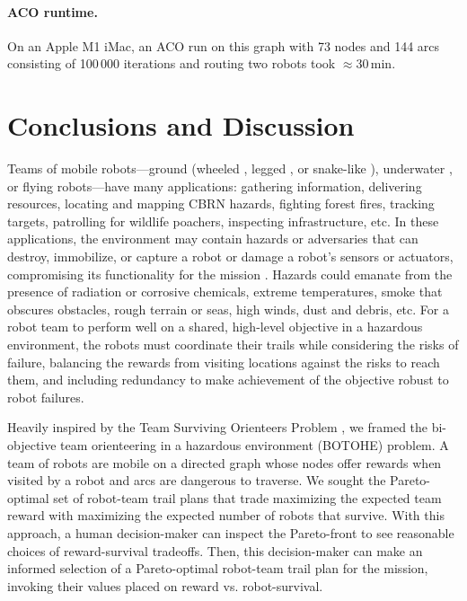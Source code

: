 \documentclass[fleqn,10pt,lineno]{wlpeerj}
\begin{document}
\paragraph{ACO runtime.} On an Apple M1 iMac, an ACO run on this graph with 73 nodes and 144 arcs consisting of 100\,000 iterations and routing two robots took $\approx$30\,min.




\section{Conclusions and Discussion}
Teams of mobile robots---ground (wheeled \cite{chung2016wheeled}, legged \cite{wieber2016modeling}, or snake-like \cite{walker2016snake}), underwater \cite{choi2016underwater}, or flying \cite{leutenegger2016flying} robots---have many applications: gathering information, delivering resources, locating and mapping CBRN hazards, fighting forest fires, tracking targets, patrolling for wildlife poachers, inspecting infrastructure, etc.
In these applications, the environment may contain hazards or adversaries that can destroy, immobilize, or capture a robot or damage a robot's sensors or actuators, compromising its functionality for the mission \cite{trevelyan2016robotics}.
Hazards could emanate from the presence of radiation or corrosive chemicals, extreme temperatures, smoke that obscures obstacles, rough terrain or seas, high winds, dust and debris, etc.
For a robot team to perform well on a shared, high-level objective in a hazardous environment, the robots must coordinate their trails while considering the risks of failure, balancing the rewards from visiting locations against the risks to reach them, and including redundancy to make achievement of the objective robust to robot failures. 

Heavily inspired by the Team Surviving Orienteers Problem \cite{jorgensen2018team,jorgensen2017matroid,jorgensen2024matroid}, we framed the bi-objective team orienteering in a hazardous environment (BOTOHE) problem.
A team of robots are mobile on a directed graph whose nodes offer rewards when visited by a robot and arcs are dangerous to traverse.
We sought the Pareto-optimal set of robot-team trail plans that trade maximizing the expected team reward with maximizing the expected number of robots that survive. 
With this approach, a human decision-maker can inspect the Pareto-front to see reasonable choices of reward-survival tradeoffs. Then, this decision-maker can make an informed selection of a Pareto-optimal robot-team trail plan for the mission, invoking their values placed on reward vs. robot-survival.
\end{document}
